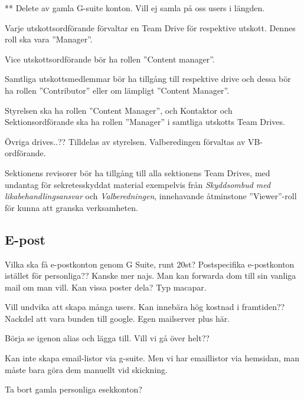 \documentclass[10pt]{article}
\begin{document}
    ** Delete av gamla G-suite konton. Vill ej samla på oss users i längden. 
    \begin{dashlist}

    \item Varje utskottsordförande förvaltar en Team Drive för respektive utskott. Dennes roll ska vara ''Manager''. 
    
    \item Vice utskottsordförande bör ha rollen ''Content manager''. 

    \item Samtliga utskottsmedlemmar bör ha tillgång till respektive drive och dessa bör ha rollen ''Contributor'' eller om lämpligt ''Content Manager''. 
    
    \item Styrelsen ska ha rollen ''Content Manager'', och Kontaktor och Sektionsordförande ska ha rollen ''Manager'' i samtliga utskotts Team Drives.  
    
    \item Övriga drives..?? Tilldelas av styrelsen. Valberedingen förvaltas av VB-ordförande.

    \item Sektionens revisorer bör ha tillgång till alla sektionens Team Drives, med undantag för sekretesskyddat material exempelvis från \textit{Skyddsombud med likabehandlingsansvar} och \textit{Valberedningen}, innehavande åtminstone ''Viewer''-roll för kunna att granska verksamheten. 
    
    \end{dashlist}

    \subsection{E-post}

    \begin{dashlist}
        \item Vilka ska få e-postkonton genom G Suite, runt 20st? Postspecifika e-postkonton istället för personliga?? Kanske mer najs. Man kan forwarda dom till sin vanliga mail om man vill. Kan vissa poster dela? Typ macapar. 
        \item Vill undvika att skapa många users. Kan innebära hög kostnad i framtiden?? Nackdel att vara bunden till google. Egen mailserver plus här. 
        \item Börja se igenon alias och lägga till. Vill vi gå över helt?? 
        \item Kan inte skapa email-listor via g-suite. Men vi har emaillistor via hemsidan, man måste bara göra dem manuellt vid skickning.  
        \item Ta bort gamla personliga esekkonton?
    \end{dashlist}
\end{document}
